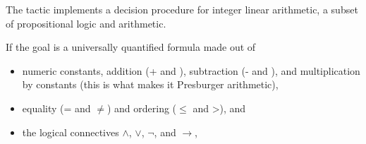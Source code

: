 \documentclass[12pt]{report}
\begin{document}
 The  tactic implements a decision procedure for integer linear
    arithmetic, a subset of propositional logic and arithmetic.


    If the goal is a universally quantified formula made out of



\begin{itemize}
\item  numeric constants, addition (+ and ), subtraction (-
        and ), and multiplication by constants (this is what
        makes it Presburger arithmetic),



\item  equality (= and \ensuremath{\not=}) and ordering (\ensuremath{\le} and >), and



\item  the logical connectives \ensuremath{\land}, \ensuremath{\lor}, \ensuremath{\lnot}, and \ensuremath{\rightarrow},

\end{itemize}
\end{document}
